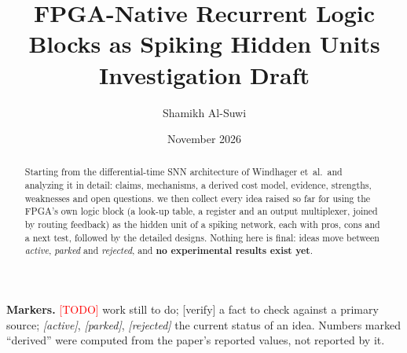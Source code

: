 \documentclass[11pt,a4paper]{article}
\title{FPGA-Native Recurrent Logic Blocks as Spiking Hidden Units\\[0.4em]\large Investigation Draft}
\author{Shamikh Al-Suwi}
\date{November 2026}
\begin{document}
\maketitle

\begin{abstract}
 Starting from the differential-time SNN architecture of Windhager et~al.\ and analyzing it in detail: claims, mechanisms, a derived cost model, evidence, strengths, weaknesses and open questions. we then collect every idea raised so far for using the FPGA's own logic block (a look-up table, a register and an output multiplexer, joined by routing feedback) as the hidden unit of a spiking network, each with pros, cons and a next test, followed by the detailed designs. Nothing here is final: ideas move between \emph{active}, \emph{parked} and \emph{rejected}, and \textbf{no experimental results exist yet}.
\end{abstract}



\tableofcontents

\medskip\noindent\textbf{Markers.} \textcolor{red}{[TODO]} work still to do; \textcolor{orange!80!black}{[verify]} a fact to check against a primary source; \textit{[active]}, \textit{[parked]}, \textit{[rejected]} the current status of an idea. Numbers marked ``derived'' were computed from the paper's reported values, not reported by it.
\newpage














\appendix




\end{document}
